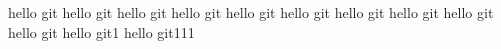 hello git
hello git
hello git
hello git
hello git
hello git
hello git
hello git
hello git
hello git
hello git1
hello git111
